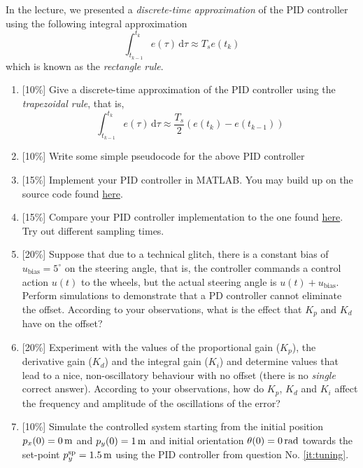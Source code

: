 \documentclass[a4paper,11pt,reqno]{amsart}
\numberwithin{equation}{section}
\theoremstyle{plain}
\begin{document}
\vspace{1em}
 In the lecture, we presented a \textit{discrete-time approximation} of the 
       PID controller using the following integral approximation
       \[
        \int_{t_{k-1}}^{t_k} e(\tau)\, {}\mathrm{d}\tau {}\approx{} T_s e(t_k)
       \]
       which is known as the \textit{rectangle rule}.
      \begin{enumerate}
	\item {}[10\%]{} Give a discrete-time approximation of the PID controller using the 
	      \textit{trapezoidal rule}, that is, 
	      \[
	      \int_{t_{k-1}}^{t_k} e(\tau)\, {}\mathrm{d}\tau 
	      {}\approx{} 
	      \frac{T_s}{2} \left(e(t_k) - e(t_{k-1})\right)
	      \]
	\item {}[10\%]{} Write some simple pseudocode for the above PID controller
	\item {}[15\%]{} Implement your PID controller in MATLAB. You may build up on the source 
	      code found \href{https://github.com/alphaville/pid-101/matlab/}{here}.
	\item {}[15\%]{} Compare your PID controller implementation to the one 
	      found \href{https://alphaville.github.io/pid-101/matlab/}{here}.
	      Try out different sampling times.	
	\item {}[20\%]{} Suppose that due to a technical glitch, there is a constant bias of $u_{\mathrm{bias}} = 5^\circ$
	      on the steering angle, that is, the controller commands a control action $u(t)$ to the 
	      wheels, but the actual steering angle is $u(t) + u_{\mathrm{bias}}$.
	      Perform simulations to demonstrate that a PD controller cannot eliminate the offset.
	      According to your observations, what is the effect that $K_p$ and $K_d$ have on the offset? 
        \item \label{it:tuning}
	      {}[20\%]{} 
              Experiment with the values of the proportional gain ($K_p$), the derivative gain ($K_d$)
              and the integral gain ($K_i$) and determine values that lead to a nice, non-oscillatory behaviour with no 
              offset (there is no \textit{single} correct answer). According to your observations, 
              how do $K_p$, $K_d$ and $K_i$ affect the frequency and amplitude of the oscillations 
              of the error?
        \item {}[10\%]{} Simulate the controlled system starting from the initial position $p_x(0)=\unit[0]{m}$ and $p_y(0)=\unit[1]{m}$
              and initial orientation $\theta(0) = \unit[0]{rad}$ towards the set-point $p_y^{\mathrm{sp}} = \unit[1.5]{m}$
              using the PID controller from question No. \ref{it:tuning}.
      \end{enumerate}
\end{document}

